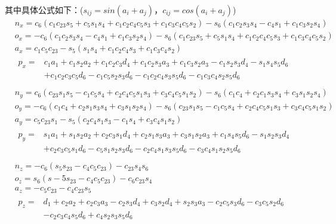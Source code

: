 \documentclass{seuthesis-2022}
\numberwithin{equation}{section}
\begin{document}
其中具体公式如下：($s_{ij}=sin(a_i+a_j)$，$c_{ij}=cos(a_i+a_j)$)
\begin{equation}
  \begin{aligned}
    &n_x = c_6(c_1c_{23}s_5+c_5s_1s_4+c_1c_2c_4c_5s_3+c_1c_3c_4c_5s_2) - s_6(c_1c_2s_3s_4-c_4s_1+c_1c_3s_2s_4)\\
    &o_x = -c_6(c_1c_2s_3s_4-c_4s_1+c_1c_3s_2s_4) - s_6(c_1c_{23}s_5+c_5s_1s_4+c_1c_2c_4c_5s_3+c_1c_3c_4c_5s_2)\\
    &a_x = c_1c_5c_{23} - s_5(s_1s_4+c_1c_2c_4s_3+c_1c_3c_4s_2)\\
    &\begin{split}
      p_x = &c_1a_1+c_1s_2a_2+c_1c_2c_3d_4+c_1c_2s_3a_3+c_1c_3s_2a_3-c_1s_2s_3d_4-s_1s_4s_5d_6\\
            &+c_1c_2c_3c_5d_6-c_1c_5s_2s_3d_6-c_1c_2c_4s_3s_5d_6-c_1c_3c_4s_2s_5d_6\\
     \end{split}\\
    &n_y = c_6(c_{23}s_1s_5-c_1c_5s_4+c_2c_4c_5s_1s_3+c_3c_4c_5s_1s_2) - s_6(c_1c_4+c_2c_1s_3s_4+c_3s_1s_2s_4)\\
    &o_y = -c_6(c_1c_4+c_2s_1s_3s_4+c_3s_1s_2s_4) - s_6(c_{23}s_1s_5-c_1c_5s_4+c_2c_4c_5s_1s_3+c_3c_4c_5s_1s_2)\\
    &a_y = c_5c_{23}s_1 - s_5(c_2c_4s_1s_3-c_1s_4+c_3c_4s_1s_2)\\
    &\begin{split}
      p_y = &s_1a_1 + s_1s_2a_2 + c_2c_3s_1d_4 + c_2s_1s_3a_3 + c_3s_1s_2a_3 + c_1s_4s_5d_6 - s_1s_2s_3d_4\\
            &+c_2c_3c_5s_1d_6 - c_5s_1s_2s_3d_6 - c_2c_4s_1s_3s_5d_6 - c_3c_4s_1s_2s_5d_6\\
     \end{split}\\ 
    &n_z = -c_6(s_5s_{23}-c_4c_5c_{23}) - c_{23}s_4s_6\\
    &o_z = s_6(s-5s_{23}-c_4c_5c_{23}) - c_6c_{23}s_4\\ 
    &a_z = -c_5c_{23} - c_4c_{23}s_5\\
    &\begin{split}
      p_z = &d_1 + c_2a_2 + c_2c_3a_3 - c_2s_3d_4 + c_3s_2d_4 + s_2s_3a_3 - c_2c_5s_3d_6 - c_3c_5s_2d_6\\
            &- c_2c_3c_4s_5d_6 + c_4s_2s_3s_5d_6\\
     \end{split}
  \end{aligned} 
\end{equation}
\end{document}
